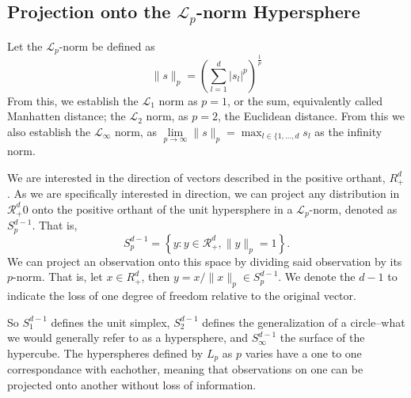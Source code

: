 \subsection{Projection onto the $\mathcal{L}_p$-norm Hypersphere}
Let the $\mathcal{L}_p$-norm be defined as
  \begin{equation*}
    \lVert s \rVert_p = \left(\sum_{l = 1}^d \lvert s_l\rvert^p\right)^{\frac{1}{p}}
  \end{equation*}
  From this, we establish the $\mathcal{L}_1$ norm as $p = 1$, or the sum, equivalently called
  Manhatten distance; the $\mathcal{L}_2$ norm, as $p = 2$, the Euclidean distance.  From this we
  also establish the $\mathcal{L}_{\infty}$ norm, as
  $\lim\limits_{p\to\infty} \lVert s \rVert_p = \max_{l\in\lbrace{1,\ldots,d}}s_l$ as the infinity
  norm.

We are interested in the direction of vectors described in the positive orthant, $R_{+}^d$.  As we
  are specifically interested in direction, we can project any distribution in $\mathcal{R}_{+}^d$0
  onto the positive orthant of the unit hypersphere in a $\mathcal{L}_p$-norm, denoted as
  $S_{p}^{d-1}$.  That is,
  \begin{equation*}
    S_{p}^{d-1} = \left\lbrace y : y \in \mathcal{R}_{+}^{d}, \lVert y\rVert_{p} = 1\right\rbrace.
  \end{equation*}
  We can project an observation onto this space by dividing said observation by its $p$-norm.  That
  is, let $x\in R_{+}^{d}$, then $y = x / \lVert x\rVert_p \in S_{p}^{d-1}$.  We denote the $d-1$
  to indicate the loss of one degree of freedom relative to the original vector.

So $S_{1}^{d-1}$ defines the unit simplex, $S_{2}^{d-1}$ defines the generalization of a
  circle--what we would generally refer to as a hypersphere, and $S_{\infty}^{d-1}$ the surface of
  the hypercube. The hyperspheres defined by $L_p$ as $p$ varies have a one to one correspondance
  with eachother, meaning that observations on one can be projected onto another without loss of
  information.

